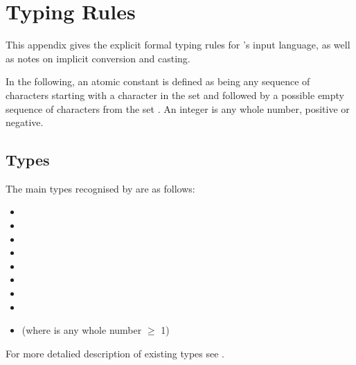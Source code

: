 
\chapter{Typing Rules}
This appendix gives the explicit formal typing rules for {\nusmv}'s
input language, as well as notes on implicit conversion and casting.

In the following, an atomic constant is defined as being any sequence
of characters starting with a character in the set 
and followed by a possible empty sequence of characters from the set
. An integer is any whole
number, positive or negative.

\section{Types}

The main types recognised by \nusmv are as follows:
\begin{itemize}
\item[] \Boolean 
\item[] \Integer 
\item[] \SymbEnum 
\item[] \IntSymbEnum 
\item[] \BoolSet
\item[] \IntSet 
\item[] \SymbSet 
\item[] \IntSymbSet 
\item[] \Word[N] (where  is any whole number $\geq$ 1)
\end{itemize}

For more detalied description of existing types see .
 
